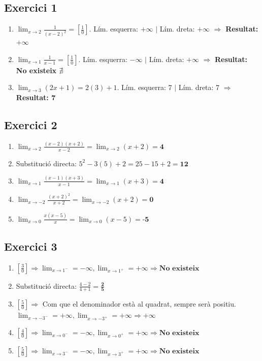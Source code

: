 \documentclass[12pt,a4paper]{article}
\begin{document}
\subsection*{Exercici 1}
\begin{enumerate}[label=\textbf{\alph*)}]
    \item $\lim_{x \to 2} \frac{1}{(x-2)^2} = \left[ \frac{1}{0} \right]$. Lím. esquerra: $+\infty$ $|$ Lím. dreta: $+\infty$ $\Rightarrow$ \textbf{Resultat: $+\infty$}
    \item $\lim_{x \to 1} \frac{1}{x-1} = \left[ \frac{1}{0} \right]$. Lím. esquerra: $-\infty$ $|$ Lím. dreta: $+\infty$ $\Rightarrow$ \textbf{Resultat: No existeix $\nexists$}
    \item $\lim_{x \to 3} (2x + 1) = 2(3)+1$. Lím. esquerra: 7 $|$ Lím. dreta: 7 $\Rightarrow$ \textbf{Resultat: 7}
\end{enumerate}

\subsection*{Exercici 2}
\begin{enumerate}[label=\textbf{\alph*)}]
    \item $\lim_{x \to 2} \frac{(x-2)(x+2)}{x-2} = \lim_{x \to 2} (x+2) = \textbf{4}$
    \item Substitució directa: $5^2 - 3(5) + 2 = 25 - 15 + 2 = \textbf{12}$
    \item $\lim_{x \to 1} \frac{(x-1)(x+3)}{x-1} = \lim_{x \to 1} (x+3) = \textbf{4}$
    \item $\lim_{x \to -2} \frac{(x+2)^2}{x+2} = \lim_{x \to -2} (x+2) = \textbf{0}$
    \item $\lim_{x \to 0} \frac{x(x-5)}{x} = \lim_{x \to 0} (x-5) = \textbf{-5}$
\end{enumerate}

\subsection*{Exercici 3}
\begin{enumerate}[label=\textbf{\alph*)}]
    \item $\left[ \frac{3}{0} \right] \Rightarrow \lim_{x \to 1^-} = -\infty, \lim_{x \to 1^+} = +\infty \Rightarrow \textbf{No existeix}$
    \item Substitució directa: $\frac{4-2}{4+1} = \mathbf{\frac{2}{5}}$
    \item $\left[ \frac{5}{0} \right] \Rightarrow$ Com que el denominador està al quadrat, sempre serà positiu. $\lim_{x \to -3^-} = +\infty, \lim_{x \to -3^+} = +\infty \Rightarrow \mathbf{+\infty}$
    \item $\left[ \frac{4}{0} \right] \Rightarrow \lim_{x \to 0^-} = -\infty, \lim_{x \to 0^+} = +\infty \Rightarrow \textbf{No existeix}$
    \item $\left[ \frac{5}{0} \right] \Rightarrow \lim_{x \to 3^-} = -\infty, \lim_{x \to 3^+} = +\infty \Rightarrow \textbf{No existeix}$
\end{enumerate}
\end{document}
